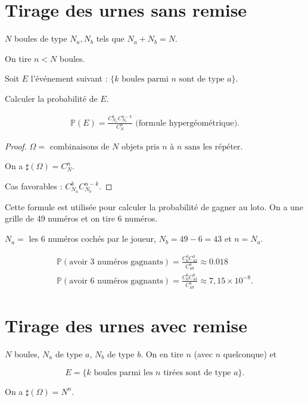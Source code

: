 \documentclass[french]{book}
\theoremstyle{definition}
\theoremstyle{remark}
\newcommand{\lesss}{<}
\newcommand{\less}{\lesss}
\begin{document}
\section{Tirage des urnes sans remise}

$N$ boules de type $N_a, N_b$ tels que $N_a + N_b = N$.

On tire $n \less N$ boules.

Soit $E$ l'événement suivant : $\{ k \text{ boules parmi } n \text{ sont de type } a \}$.

Calculer la probabilité de $E$.

\begin{gather*}
  \mathbb{P}( E ) = \frac{C _{N_a} ^{k} C _{N_b} ^{n-k}}{C_N ^{n}} \text{ (formule hypergéométrique).}
\end{gather*}

\begin{proof}
  $\Omega = \text{ combinaisons de } N \text{ objets pris } n \text{ à } n \text{ sans les répéter. }   $

  On a $\sharp(\Omega) = C_N ^{n}$.

  Cas favorables : $C _{N_a} ^{k} C _{N_b}^{n-k}$.
\end{proof}

Cette formule est utilisée pour calculer la probabilité de gagner au loto. On a une grille de 49 numéros et on tire 6 numéros.

$N_a =$ les 6 numéros cochés par le joueur, $N_b = 49-6 = 43$ et $n=N_a$.

\begin{gather*}
  \mathbb{P}( \text{avoir 3 numéros gagnants} ) = \frac{C^{3}_{6} C^{3}_{43}}{C^{6}_{49}} \approx 0.018 \\
  \mathbb{P}( \text{avoir 6 numéros gagnants} ) = \frac{C^{6}_{6} C^{0}_{43}}{C_{49}^{6}} \approx 7,15 \times 10 ^{-8}.
\end{gather*}

\section{Tirage des urnes avec remise}

$N$ boules, $N_a$ de type $a$, $N_b$ de type $b$. On en tire $n$ (avec $n$ quelconque) et

\begin{equation*}
  E = \{ k \text{ boules parmi les } n \text{ tirées sont de type } a  \}.
\end{equation*}

On a $\sharp(\Omega) = N ^{n}$.
\end{document}
